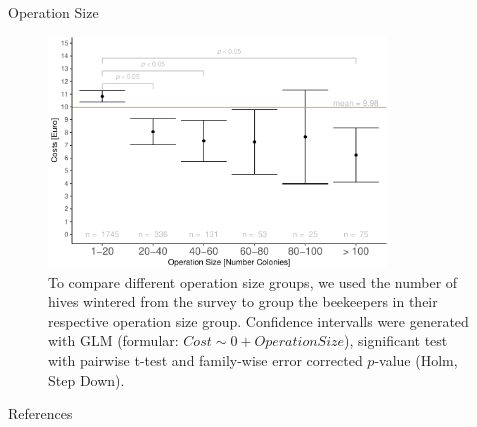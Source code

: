 \documentclass{beamer}
\begin{document}
\begin{frame}{}
\begin{columns}[t]
\begin{column}{0.49\textwidth}
    \begin{block}{Operation Size}
      \begin{figure}
      \begin{minipage}[t][0.20\paperheight][c]{0.97\textwidth} 
      \centering
      \includegraphics[width=0.8\textwidth]{img/operation-ci-1.pdf}
      \caption{To compare different operation size groups, we used the number of hives wintered from the survey to group the beekeepers in their respective operation size group. Confidence intervalls were generated with GLM (formular: $Cost \sim 0 + Operation Size$), significant test with pairwise t-test and family-wise error corrected $p$-value (Holm, Step Down).}
      \end{minipage}
      \end{figure}
    \end{block}


    {
      \begin{block}{References}
      {
      \footnotesize
      \printbibliography
      }
      \end{block}
    }

  \end{column}
\end{columns}

\end{frame}
\end{document}
